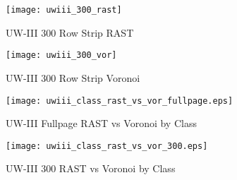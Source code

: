 \documentclass[conference]{IEEEtran}
\begin{document}
%

\begin{figure}[300-uwiii-rast]
\texttt{[image: uwiii\_300\_rast]}
\caption{UW-III 300 Row Strip RAST}
\label{fig:300-uwiii-rast}
\end{figure}

\begin{figure}[300-uwiii-vor]
\texttt{[image: uwiii\_300\_vor]}
\caption{UW-III 300 Row Strip Voronoi}
\label{fig:300-uwiii-vor}
\end{figure}

\begin{figure}[uwiii-rast-vs-vor-fullpage]
\texttt{[image: uwiii\_class\_rast\_vs\_vor\_fullpage.eps]}
\caption{UW-III Fullpage RAST vs Voronoi by Class}
\label{fig:uwiii-rast-vs-vor-fullpage}
\end{figure}
\begin{figure}[uwiii-class-rast-vs-vor-300]
\texttt{[image: uwiii\_class\_rast\_vs\_vor\_300.eps]}
\caption{UW-III 300 RAST vs Voronoi by Class}
\label{fig:uwiii-class-rast-vs-vor-300}
\end{figure}

%
\end{document}
